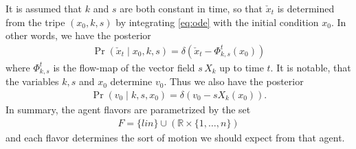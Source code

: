\documentclass[conference]{IEEEtran}
\begin{document}
It is assumed that $k$ and $s$ are both constant in time, so that $\check{x}_t$ is determined from the
tripe $(x_0,k,s)$ by integrating \eqref{eq:ode} with the initial condition $x_0$.
In other words, we have the posterior
\begin{align*}
	\Pr( \check{x}_t \mid x_0 , k , s) = \delta( \check{x}_t - \Phi^{t}_{k,s}( x_0) )
\end{align*}
where $\Phi^{t}_{k,s}$ is the flow-map of the vector field $s \,X_k$ up to time $t$.
It is notable, that the variables $k,s$ and $x_0$ determine $v_0$.
Thus we also have the posterior
\begin{align*}
	\Pr( v_0 \mid k, s, x_0) = \delta( v_0 -s X_k( x_0) ).
\end{align*}
In summary, the agent flavors are parametrized by the set
\begin{align*}
	F = \{ lin \} \cup \left( \mathbb{R} \times \{ 1 , \dots, n \} \right)
\end{align*}
and each flavor determines the sort of motion we should expect from that agent.
\end{document}
